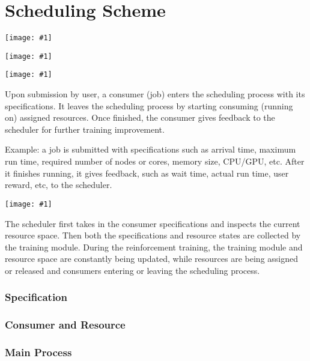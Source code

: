 \documentclass{article}
\theoremstyle{definition}
\theoremstyle{remark}
\newcommand{\addpic}[1]{\texttt{[image: \#1]}}
\begin{document}
\newpage

\part{Scheduling Scheme}

	\addpic{figures/Intro-General.jpg}

	\addpic{figures/all-process.jpg}

	\addpic{figures/Macro-graph.png}


	Upon submission by user, a consumer (job) enters the scheduling process with its specifications. It leaves the scheduling process by starting consuming (running on) assigned resources. Once finished, the consumer gives feedback to the scheduler for further training improvement.

	Example: a job is submitted with specifications such as arrival time, maximum run time, required number of nodes or cores, memory size, CPU/GPU, etc. After it finishes running, it gives feedback, such as wait time, actual run time, user reward, etc, to the scheduler.

	\addpic{figures/Intro-Scheduler.jpg}

	The scheduler first takes in the consumer specifications and inspects the current resource space. Then both the specifications and resource states are collected by the training module. During the reinforcement training, the training module and resource space are constantly being updated, while resources are being assigned or released and consumers entering or leaving the scheduling process.


	\section{Specification}

	\section{Consumer and Resource}

	\section{Main Process}
\end{document}
